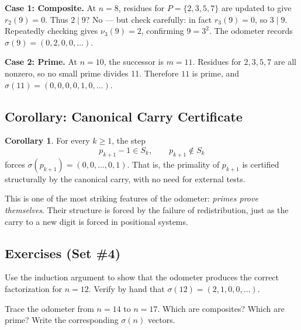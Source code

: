 \documentclass[11pt]{article}
\theoremstyle{definition}
\newtheorem{corollary}{Corollary}[section]
\begin{document}
\begin{studentexample}
\textbf{Case 1: Composite.}  
At $n=8$, residues for $P=\{2,3,5,7\}$ are updated to give $r_2(9)=0$.  
Thus $2 \mid 9$? No — but check carefully: in fact $r_3(9)=0$, so $3 \mid 9$.  
Repeatedly checking gives $\nu_3(9)=2$, confirming $9=3^2$.  
The odometer records $\sigma(9)=(0,2,0,0,\dots)$.
\end{studentexample}

\begin{studentexample}
\textbf{Case 2: Prime.}  
At $n=10$, the successor is $m=11$.  
Residues for $2,3,5,7$ are all nonzero, so no small prime divides 11.  
Therefore $11$ is prime, and $\sigma(11) = (0,0,0,0,1,0,\dots)$.
\end{studentexample}

\subsection{Corollary: Canonical Carry Certificate}

\begin{corollary}
For every $k \geq 1$, the step
\[
p_{k+1}-1 \in S_k, \qquad p_{k+1} \notin S_k
\]
forces $\sigma(p_{k+1}) = (0,0,\dots,0,1)$.  
That is, the primality of $p_{k+1}$ is certified structurally by the canonical carry, 
with no need for external tests.
\end{corollary}

\begin{studentnote}
This is one of the most striking features of the odometer: 
\emph{primes prove themselves}.  
Their structure is forced by the failure of redistribution, 
just as the carry to a new digit is forced in positional systems.
\end{studentnote}

\subsection*{Exercises (Set \#4)}

\begin{studentexercise}
Use the induction argument to show that the odometer produces the correct factorization 
for $n=12$. Verify by hand that $\sigma(12)=(2,1,0,0,\dots)$.
\end{studentexercise}

\begin{studentexercise}
Trace the odometer from $n=14$ to $n=17$.  
Which are composites? Which are prime?  
Write the corresponding $\sigma(n)$ vectors.
\end{studentexercise}
\end{document}
